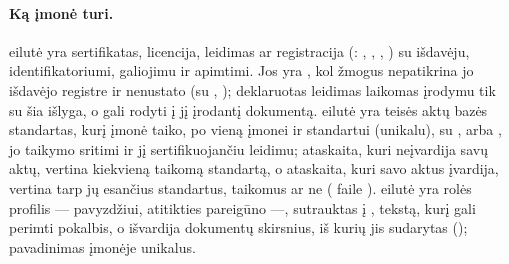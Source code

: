 \paragraph{Ką įmonė turi.}  eilutė yra sertifikatas, licencija,
leidimas ar registracija (: , , ,
) su išdavėju, identifikatoriumi, galiojimu ir apimtimi. Jos
 yra , kol žmogus nepatikrina jo išdavėjo registre ir nenustato
 (su , ); deklaruotas leidimas laikomas
įrodymu tik su šia išlyga, o  gali rodyti į jį įrodantį dokumentą.
 eilutė yra teisės aktų bazės standartas, kurį įmonė taiko, po vieną
įmonei ir standartui (unikalu), su  ,  arba
, jo taikymo sritimi ir jį sertifikuojančiu leidimu; ataskaita, kuri
neįvardija savų aktų, vertina kiekvieną taikomą standartą, o ataskaita, kuri savo aktus
įvardija, vertina tarp jų esančius standartus, taikomus ar ne ( faile
).  eilutė yra rolės profilis --- pavyzdžiui,
atitikties pareigūno ---, sutrauktas į , tekstą, kurį gali perimti pokalbis, o
 išvardija dokumentų skirsnius, iš kurių jis sudarytas
(); pavadinimas įmonėje unikalus.

